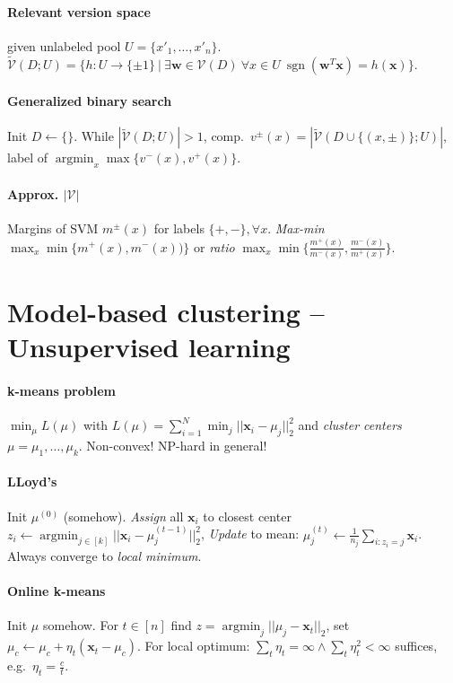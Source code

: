 \documentclass[9pt]{scrartcl}
\DeclareMathOperator{\sign}{sgn}
\DeclareMathOperator{\argmin}{argmin}
\begin{document}
\begin{twocolumn}
\paragraph{Relevant version space} given unlabeled pool $U = \{x'_1,\dots,x'_n\}$.
$\tilde{\mathcal{V}}(D;U) = \{h: U\rightarrow\{\pm 1\}\ |\ \exists\bm w \in \mathcal{V}(D)\ \forall x\in U\ \sign(\bm w^T \bm x) = h(\bm x)\}.$

\paragraph{Generalized binary search}
Init $D \leftarrow \{\}$.
While $|\tilde{\mathcal{V}}(D;U)| > 1$, comp.\ $v^\pm(x) = |\tilde{\mathcal{V}}(D \cup \{(x,\pm)\};U)|$, label of $\argmin_x \max\{v^-(x),v^+(x)\}$.

\paragraph{Approx. $|\mathcal{V}|$}
Margins of SVM $m^\pm(x)$ for labels $\{+,-\}, \forall x$. \emph{Max-min} $\max_x \min\{m^+(x),m^-(x))\}$ or \emph{ratio} $\max_x \min\{\frac{m^+(x)}{m^-(x)},\frac{m^-(x)}{m^+(x)}\}$.

\section{Model-based clustering -- Unsupervised learning}
\paragraph{k-means problem}
$\min_\mu L(\mu)$ with
$L(\mu) = \sum_{i=1}^{N}\min_j||\bm x_i-\mu_j||_2^2$ and \emph{cluster centers} $\mu = \mu_1,\dots,\mu_k$.
Non-convex! NP-hard in general!

\paragraph{LLoyd's}
Init $\mu^{(0)}$ (somehow).
\emph{Assign} all $\bm x_i$ to closest center $z_i \leftarrow \argmin_{j \in [k]} ||\bm x_i - \mu_j^{(t-1)}||_2^2$,
\emph{Update} to mean: $\mu_j^{(t)} \leftarrow \frac{1}{n_j}\sum_{i:z_i = j}\bm x_i$.
Always converge to \emph{local minimum}.

\paragraph{Online k-means} Init $\mu$ somehow.
For $t \in [n]$ find $z = \argmin_j||\mu_j-\bm x_t||_2$, set $\mu_c \leftarrow \mu_c + \eta_t(\bm x_t - \mu_c)$. For local optimum: $\sum_t \eta_t = \infty \wedge \sum_t \eta_t^2 < \infty$ suffices, e.g.\ $\eta_t = \frac{c}{t}$.


\end{twocolumn}
\end{document}
